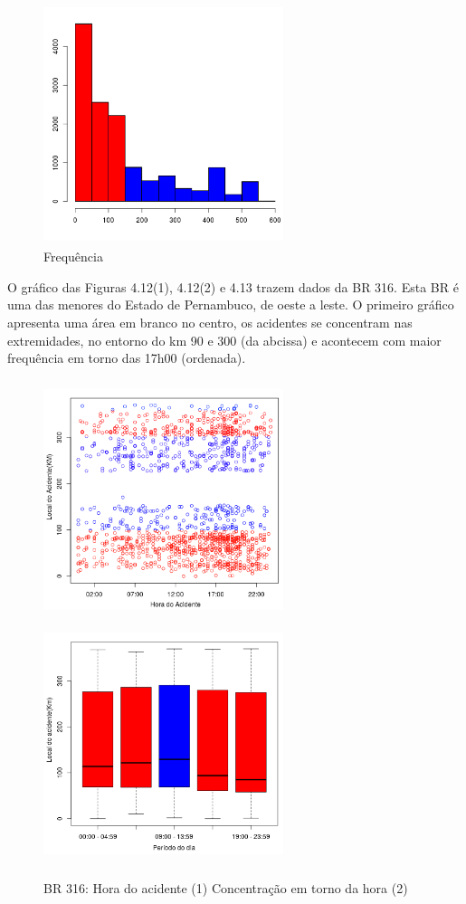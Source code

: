 \quad \quad
\begin{figure}[h]
	\centering
	\caption{ Frequência}
	\includegraphics[width=7cm,height=7cm]{Figuras/Preprocess/br232_3.png}
\end{figure}




\pagebreak

O gráfico das Figuras 4.12(1), 4.12(2)  e 4.13 trazem dados da BR 316. Esta BR é uma das menores do Estado de Pernambuco, de oeste a leste. O primeiro gráfico apresenta uma área em branco no centro, os acidentes se concentram nas extremidades, no entorno do km 90 e 300 (da abcissa) e acontecem com maior frequência em torno das 17h00 (ordenada).

\begin{figure}[h]
	\caption{BR 316: Hora do acidente (1) Concentração em torno da hora (2)}
	\includegraphics[width=7cm,height=7cm]{Figuras/Preprocess/br316_1.png}
	\includegraphics[width=7cm,height=7cm]{Figuras/Preprocess/br316_2.png}

\end{figure}

